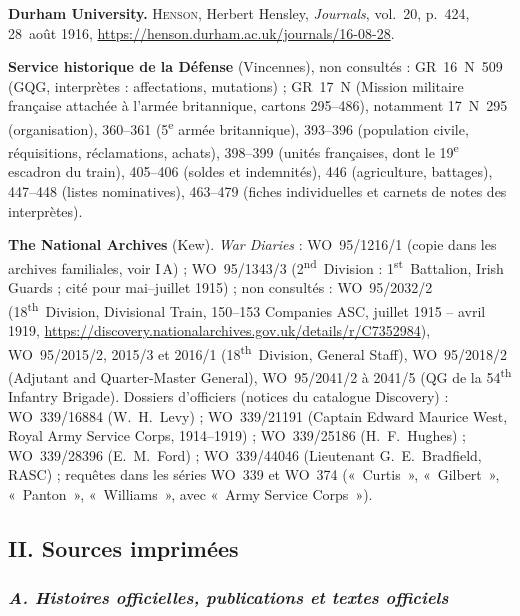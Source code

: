 \begin{biblist}
\item \textbf{Durham University.} \textsc{Henson}, Herbert Hensley, \textit{Journals}, vol.~20, p.~424, 28~août 1916, \url{https://henson.durham.ac.uk/journals/16-08-28}.
\item \textbf{Service historique de la Défense} (Vincennes), non consultés : GR~16~N~509 (GQG, interprètes : affectations, mutations) ; GR~17~N (Mission militaire française attachée à l'armée britannique, cartons 295--486), notamment 17~N~295 (organisation), 360--361 (5\textsuperscript{e} armée britannique), 393--396 (population civile, réquisitions, réclamations, achats), 398--399 (unités françaises, dont le 19\textsuperscript{e} escadron du train), 405--406 (soldes et indemnités), 446 (agriculture, battages), 447--448 (listes nominatives), 463--479 (fiches individuelles et carnets de notes des interprètes).
\item \textbf{The National Archives} (Kew). \textit{War Diaries} : WO~95/1216/1 (copie dans les archives familiales, voir I\,A) ; WO~95/1343/3 (2\textsuperscript{nd}~Division : 1\textsuperscript{st}~Battalion, Irish Guards ; cité pour mai--juillet 1915) ; non consultés : WO~95/2032/2 (18\textsuperscript{th}~Division, Divisional Train, 150--153 Companies ASC, juillet 1915 -- avril 1919, \url{https://discovery.nationalarchives.gov.uk/details/r/C7352984}), WO~95/2015/2, 2015/3 et 2016/1 (18\textsuperscript{th}~Division, General Staff), WO~95/2018/2 (Adjutant and Quarter-Master General), WO~95/2041/2 à 2041/5 (QG de la 54\textsuperscript{th} Infantry Brigade). Dossiers d'officiers (notices du catalogue Discovery) : WO~339/16884 (W.~H.~Levy) ; WO~339/21191 (Captain Edward Maurice West, Royal Army Service Corps, 1914--1919) ; WO~339/25186 (H.~F.~Hughes) ; WO~339/28396 (E.~M.~Ford) ; WO~339/44046 (Lieutenant G.~E.~Bradfield, RASC) ; requêtes dans les séries WO~339 et WO~374 («~Curtis~», «~Gilbert~», «~Panton~», «~Williams~», avec «~Army Service Corps~»).
\end{biblist}

\subsection*{\normalsize\upshape\bfseries II. Sources imprimées}

\subsubsection*{\normalsize\mdseries\itshape A. Histoires officielles, publications et textes officiels}


